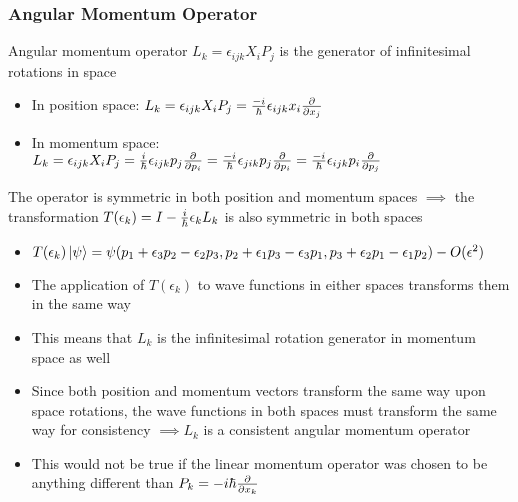 \documentclass[8pt,t,mathserif,aspectratio=169]{beamer}
\begin{document}
\begin{frame}
  \frametitle{Angular Momentum Operator}
  \vspace{1mm}
  Angular momentum operator $L_k = \epsilon_{ijk} X_i P_j$ is the generator of infinitesimal rotations in space
  \begin{itemize}
  	\item In position space: $L_k = \epsilon_{ijk} X_i P_j = {-i \over \hbar}\epsilon_{ijk} x_i {\partial \over \partial x_j}$
  	\item In momentum space: $L_k = \epsilon_{ijk} X_i P_j = {i \over \hbar}\epsilon_{ijk} p_j {\partial \over \partial p_i} = {-i \over \hbar}\epsilon_{jik} p_j {\partial \over \partial p_i} = {-i \over \hbar}\epsilon_{ijk} p_i {\partial \over \partial p_j}$
  \end{itemize}
  The operator is symmetric in both position and momentum spaces $\implies$ the transformation $T(\epsilon_k) = I - {i \over \hbar} \epsilon_k L_k$ is also symmetric in both spaces
  \begin{itemize}
    \item $T(\epsilon_k) \ket{\psi} = \psi(p_1 + \epsilon_3 p_2 - \epsilon_2 p_3,p_2 + \epsilon_1 p_3 - \epsilon_3 p_1,p_3 + \epsilon_2 p_1 - \epsilon_1 p_2) - O(\epsilon^2)$
  	\item The application of $T(\epsilon_k)$ to wave functions in either spaces transforms them in the same way
  	\item This means that $L_k$ is the infinitesimal rotation generator in momentum space as well
    \item Since both position and momentum vectors transform the same way upon space rotations, the wave functions in both spaces must transform the same way for consistency $\implies L_k$ is a consistent angular momentum operator
    \item This would not be true if the linear momentum operator was chosen to be anything different than $P_k = -i \hbar {\partial \over \partial x_k}$
  \end{itemize}
\end{frame}
\end{document}
